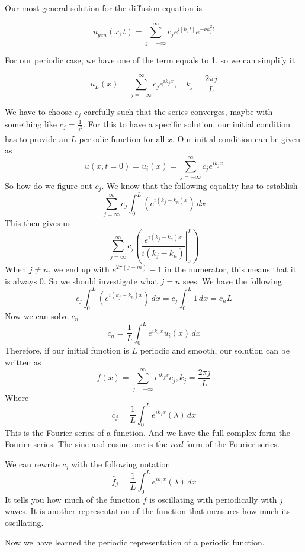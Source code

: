 \documentclass[12pt]{book}
\newcommand{\sqbkt}[1]{\left[ #1 \right]}
\newcommand{\paren}[1]{\left( #1 \right)}
\begin{document}
Our most general solution for the diffusion equation is
\begin{large}
    \[
    u_{gen}(x,t) = \sum_{j=-\infty}^{\infty}c_je^{i\sqbkt{k,t}}e^{-\nu k_j^2 t}
    \]
\end{large}
For our periodic case, we have one of the term equals to 1, so we can simplify it
\begin{large}
    \[
u_{L}(x) = \sum_{j=-\infty}^{\infty}c_j e^{ik_j x}, \quad k_j = \frac{2\pi j}{L}
\]
\end{large}
We have to choose $c_j$ carefully such that the series converges, maybe with something like $c_j = \frac{1}{j^2}$. For this to have a specific solution, our initial condition has to provide an $L$ periodic function for all $x$. Our initial condition can be given as
\[
u(x,t=0) = u_i(x) = \sum_{j=-\infty}^{\infty}c_j e^{ik_j x}
\]
So how do we figure out $c_j$. We know that the following equality has to establish
\[
\sum_{j=\infty}^{\infty} c_j \int_{0}^{L}\paren{e^{i(k_j-k_n)x}}\,dx
\]
This then gives us
\[
\sum_{j=\infty}^{\infty} c_j  \paren{\left.\frac{e^{i(k_j-k_n)x}}{i(k_j-k_n)}\right|_{0}^L}
\]
When $j\neq n$, we end up with $e^{2\pi(j-m)}-1$ in the numerator, this means that it is always $0$. So we should investigate what $j=n$ sees. We have the following
\[
c_j \int_{0}^{L}\paren{e^{i(k_j-k_n)x}}\,dx = c_j \int_{0}^{L}1\,dx = c_nL
\]
Now we can solve $c_n$
\[
c_n = \frac{1}{L}\int_0^L e^{ik_nx}u_i(x)\,dx
\]
Therefore, if our initial function is $L$ periodic and smooth, our solution can be written as
\[
f(x) = \sum_{j=-\infty}^\infty e^{ik_jx}c_j, k_j = \frac{2\pi j}{L}
\]
Where
\[
c_j = \frac{1}{L}\int_0^L e^{ik_jx}(\lambda)\,dx
\]
This is the Fourier series of a function. And we have the full complex form the Fourier series. The sine and cosine one is the \textit{real} form of the Fourier series. 

We can rewrite $c_j$ with the following notation
\[
\hat{f}_j = \frac{1}{L}\int_0^L e^{ik_jx}(\lambda)\,dx
\]
It tells you how much of the function $f$ is oscillating with periodically with $j$ waves. It is another representation of the function that measures how much its oscillating. 

Now we have learned the periodic representation of a periodic function. 
\end{document}
